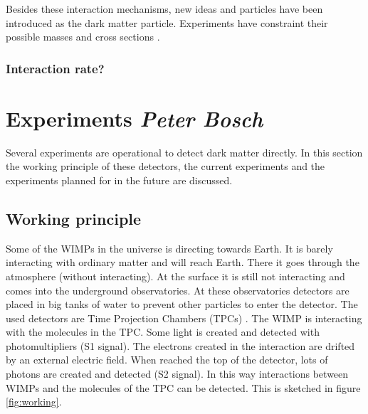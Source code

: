 \documentclass{article}
\begin{document}
Besides these interaction mechanisms, new ideas and particles have been introduced \cite{TuckerSmith:2004jv,Foot:2013uxa, Undagoitia:2015gya, Bramante:2016rdh} as the dark matter particle. 
Experiments have constraint their possible masses and cross sections \cite{Agnese:2018col}.

\subsubsection{Interaction rate?}

\newpage
\FloatBarrier
\section{Experiments \small{\textit{Peter Bosch}}}
Several experiments are operational to detect dark matter directly. In this section the working principle of these detectors, the current experiments and the experiments planned for in the future are discussed.
\subsection{Working principle}
Some of the WIMPs in the universe is directing towards Earth. It is barely interacting with ordinary matter and will reach Earth. There it goes through the atmosphere (without interacting). At the surface it is still not interacting and comes into the underground observatories. At these observatories detectors are placed in big tanks of water to prevent other particles to enter the detector. The used detectors are Time Projection Chambers (TPCs) \cite{Akerib:2015gmi}. The WIMP is interacting with the molecules in the TPC. Some light is created and detected with photomultipliers (S1 signal). The electrons created in the interaction are drifted by an external electric field. When reached the top of the detector, lots of photons are created and detected (S2 signal). In this way interactions between WIMPs and the molecules of the TPC can be detected. This is sketched in figure \ref{fig:working}.
\end{document}
